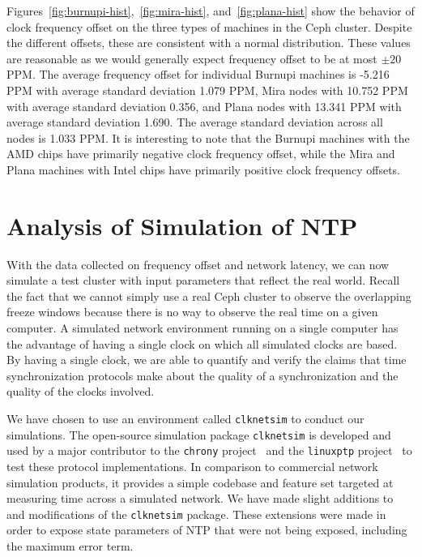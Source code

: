Figures~\ref{fig:burnupi-hist},~\ref{fig:mira-hist},
and~\ref{fig:plana-hist} show the behavior of clock frequency offset
on the three types of machines in the Ceph cluster. Despite the
different offsets, these are consistent with a normal
distribution. These values are reasonable as we would generally expect
frequency offset to be at most $\pm 20$ PPM.  The average frequency
offset for individual Burnupi machines is -5.216 PPM with average
standard deviation 1.079 PPM, Mira nodes with 10.752 PPM with average
standard deviation 0.356, and Plana nodes with 13.341 PPM with average
standard deviation 1.690. The average standard deviation across all
nodes is 1.033 PPM. It is interesting to note that the Burnupi
machines with the AMD chips have primarily negative clock frequency
offset, while the Mira and Plana machines with Intel chips have
primarily positive clock frequency offsets.



        



\section{Analysis of Simulation of NTP}

With the data collected on frequency offset and network latency, we
can now simulate a test cluster with input parameters that reflect the
real world. Recall the fact that we cannot simply use a real Ceph
cluster to observe the overlapping freeze windows because there is no
way to observe the real time on a given computer. A simulated network
environment running on a single computer has the advantage of having a
single clock on which all simulated clocks are based. By having a
single clock, we are able to quantify and verify the claims that time
synchronization protocols make about the quality of a synchronization
and the quality of the clocks involved.

We have chosen to use an environment called
\texttt{clknetsim} %
to conduct our simulations. The open-source simulation package
\texttt{clknetsim} is developed and used by a major contributor to the
\texttt{chrony} project~\citep{chrony} and the \texttt{linuxptp}
project~\citep{linuxptp} to test these protocol implementations. In
comparison to commercial network simulation products, it provides a
simple codebase and feature set targeted at measuring time across a
simulated network. We have made slight additions to and modifications
of the \texttt{clknetsim} package. These extensions were made in order
to expose state parameters of NTP that were not being exposed,
including the maximum error term.

